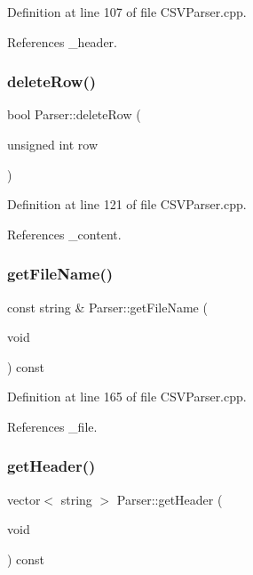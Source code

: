 Definition at line 107 of file C\+S\+V\+Parser.\+cpp.



References \+\_\+header.

\mbox{\label{class_parser_a8f625a8081a5bde560d46d18d04efb2e}} 
\subsubsection{delete\+Row()}
{\footnotesize\ttfamily bool Parser\+::delete\+Row (\begin{DoxyParamCaption}\item[{unsigned int}]{row }\end{DoxyParamCaption})}



Definition at line 121 of file C\+S\+V\+Parser.\+cpp.



References \+\_\+content.

\mbox{\label{class_parser_a3201b8253f4ea1c4420f3637c6c8de2b}} 
\subsubsection{get\+File\+Name()}
{\footnotesize\ttfamily const string \& Parser\+::get\+File\+Name (\begin{DoxyParamCaption}\item[{void}]{ }\end{DoxyParamCaption}) const}



Definition at line 165 of file C\+S\+V\+Parser.\+cpp.



References \+\_\+file.

\mbox{\label{class_parser_a0e9fb5d631e2e95685c67d8d59e1ba50}} 
\subsubsection{get\+Header()}
{\footnotesize\ttfamily vector$<$ string $>$ Parser\+::get\+Header (\begin{DoxyParamCaption}\item[{void}]{ }\end{DoxyParamCaption}) const}



